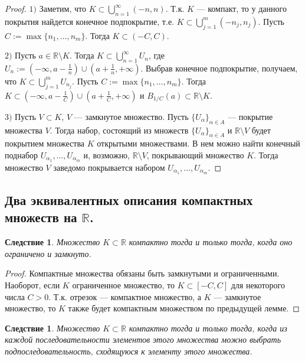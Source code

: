 \documentclass[12pt]{article}
\newtheorem{corollary}[theorem]{Следствие}
\theoremstyle{definition}
\begin{document}
\begin{proof}
$1)$ Заметим, что $K\subset \bigcup_{n=1}^\infty(-n ,n)$. Т.к. $K$ --- компакт,
то у данного покрытия найдется конечное подпокрытие, т.е.
$K\subset \bigcup_{j=1}^m(-n_j ,n_j)$. Пусть $C:=\max\{n_1, \ldots, n_m\}$.
Тогда $K\subset (-C, C)$.

$2)$ Пусть $a\in \mathbb{R}\setminus K$.
Тогда $K\subset \bigcup_{n=1}^\infty U_n$, где
$U_n:=(-\infty, a-\frac{1}{n})\cup (a+\frac{1}{n}, +\infty)$.
Выбрав конечное подпокрытие, получаем, что
$K\subset \bigcup_{j=1}^m U_{n_j}$. Пусть $C:=\max\{n_1, \ldots, n_m\}$.
Тогда $K\subset (-\infty, a-\frac{1}{C})\cup(a+\frac{1}{C}, +\infty)$
и $B_{1/C}(a)\subset \mathbb{R}\setminus K$.

$3)$ Пусть $V\subset K$, $V$ --- замкнутое множество.
Пусть $\{U_\alpha\}_{\alpha\in A}$ --- покрытие множества $V$.
Тогда набор, состоящий из множеств $\{U_\alpha\}_{\alpha\in A}$ и $\mathbb{R}\setminus V$
будет покрытием множества $K$ открытыми множествами.
В нем можно найти конечный поднабор $U_{\alpha_1}, \ldots, U_{\alpha_m}$
и, возможно, $\mathbb{R}\setminus V$, покрывающий множество $K$.
Тогда множество $V$ заведомо покрывается набором $U_{\alpha_1}, \ldots, U_{\alpha_m}$.
\end{proof}

\subsection{Два эквивалентных описания компактных множеств на $\mathbb{R}$.}

\begin{corollary}
Множество $K\subset \mathbb{R}$ компактно тогда и только тогда, когда оно ограничено и замкнуто.
\end{corollary}

\begin{proof}
Компактные множества обязаны быть замкнутыми и ограниченными.
Наоборот, если $K$ ограниченное множество, то $K\subset [-C, C]$ для некоторого числа $C>0$.
Т.к. отрезок --- компактное множество, а $K$ --- замкнутое множество,
то $K$ также будет компактным множеством по предыдущей лемме.
\end{proof}

\begin{corollary}
Множество $K\subset \mathbb{R}$ компактно тогда и только тогда, когда
из каждой последовательности элементов этого множества
можно выбрать подпоследовательность, сходящуюся к элементу этого множества.
\end{corollary}
\end{document}
